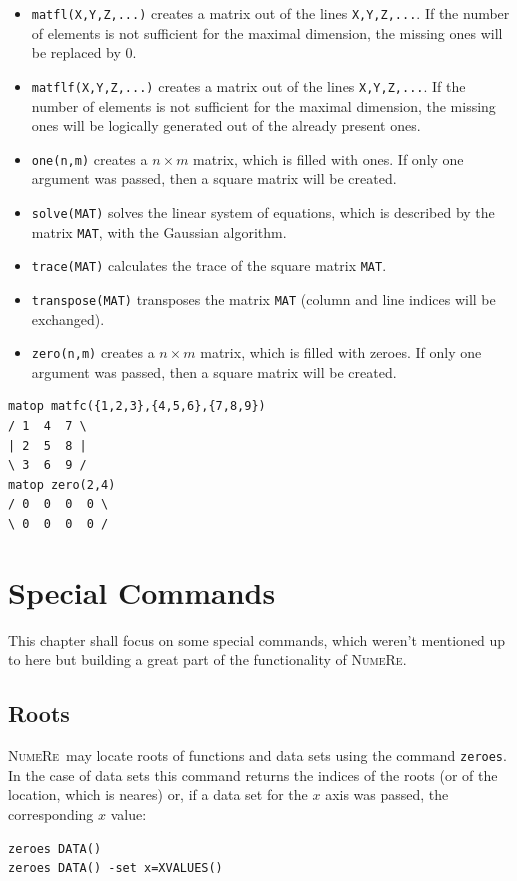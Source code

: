 \documentclass[DIV=14,headsepline,footsepline]{scrbook}
\newcommand{\NR}{\textsc{Nu\-me\-Re}}
\begin{document}
\begin{itemize}
					\item \verb+matfl(X,Y,Z,...)+ creates a matrix out of the lines \verb+X,Y,Z,...+. If the number of elements is not sufficient for the maximal dimension, the missing ones will be replaced by 0.
					\item \verb+matflf(X,Y,Z,...)+ creates a matrix out of the lines \verb+X,Y,Z,...+. If the number of elements is not sufficient for the maximal dimension, the missing ones will be logically generated out of the already present ones.
					\item \verb+one(n,m)+ creates a $n \times m$ matrix, which is filled with ones. If only one argument was passed, then a square matrix will be created.
					\item \verb+solve(MAT)+ solves the linear system of equations, which is described by the matrix \verb+MAT+, with the Gaussian algorithm.
					\item \verb+trace(MAT)+ calculates the trace of the square matrix \verb+MAT+.
					\item \verb+transpose(MAT)+ transposes the matrix \verb+MAT+ (column and line indices will be exchanged).
					\item \verb+zero(n,m)+ creates a $n \times m$ matrix, which is filled with zeroes. If only one argument was passed, then a square matrix will be created.
				\end{itemize}
				\begin{lstlisting}
matop matfc({1,2,3},{4,5,6},{7,8,9})
/ 1  4  7 \
| 2  5  8 |
\ 3  6  9 /
matop zero(2,4)
/ 0  0  0  0 \
\ 0  0  0  0 /
				\end{lstlisting}
		\chapter{Special Commands}
			This chapter shall focus on some special commands, which weren't mentioned up to here but building a great part of the functionality of \NR.
			\section{Roots}
				\NR\ may locate roots of functions and data sets using the command \verb+zeroes+\cmd{zeroes}. In the case of data sets this command returns the indices of the roots (or of the location, which is neares) or, if a data set for the $x$ axis was passed, the corresponding $x$ value:
				\begin{lstlisting}
zeroes DATA()
zeroes DATA() -set x=XVALUES()
				\end{lstlisting}
				
\end{document}
